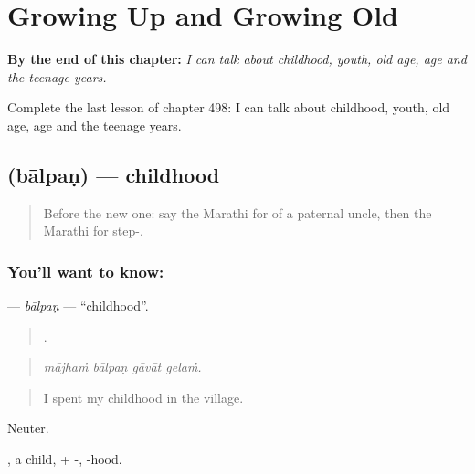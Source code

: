 
\chapter{Growing Up and Growing Old}
\label{ch:mr-growing-up-and-growing-old}

\begin{chapteropening}
\textbf{By the end of this chapter:} \emph{I can talk about childhood, youth, old age, age and the teenage years.}

Complete the last lesson of chapter 498: I can talk about childhood, youth, old age, age and the teenage years.
\end{chapteropening}

\section[\texorpdfstring{\mr{बालपण} (bālpaṇ)}{बालपण (bālpaṇ)}]{ (bālpaṇ) — childhood}

\label{lesson:MR-C498-balpan}



\begin{quote}
Before the new one: say the Marathi for of a paternal uncle, then the Marathi for step-.
\end{quote}

\subsection*{You'll want to know: }
\textbf{} — \emph{bālpaṇ} — \textquotedblleft{}childhood\textquotedblright{}.

\begin{quote}
   .
\end{quote}

\begin{quote}
\emph{mājhaṁ bālpaṇ gāvāt gelaṁ.}
\end{quote}

\begin{quote}
I spent my childhood in the village.
\end{quote}

Neuter.

, a child, + -, -hood.


